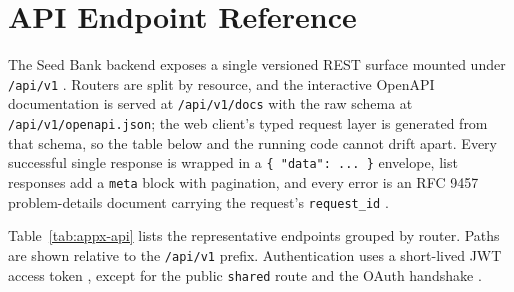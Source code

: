 \chapter{API Endpoint Reference}
\label{appx:api}

The Seed Bank backend exposes a single versioned REST surface mounted under
\texttt{/api/v1} \cite{fielding2000rest}. Routers are split by resource, and the
interactive OpenAPI documentation is served at \texttt{/api/v1/docs} with the raw
schema at \texttt{/api/v1/openapi.json}; the web client's typed request layer is
generated from that schema, so the table below and the running code cannot drift
apart. Every successful single response is wrapped in a \texttt{\{ "data": ... \}}
envelope, list responses add a \texttt{meta} block with pagination, and every error
is an RFC 9457 problem-details document carrying the request's \texttt{request\_id}
\cite{rfc9457problem}.

Table~\ref{tab:appx-api} lists the representative endpoints grouped by router.
Paths are shown relative to the \texttt{/api/v1} prefix. Authentication uses a
short-lived JWT access token \cite{rfc7519jwt}, except for the public
\texttt{shared} route and the OAuth handshake \cite{rfc6749oauth}.

